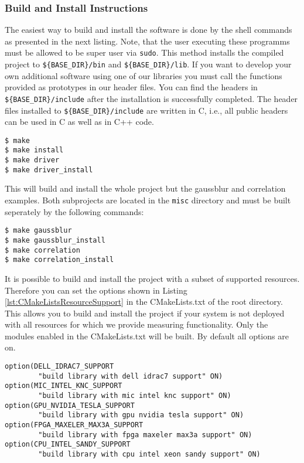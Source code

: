 \subsubsection{Build and Install Instructions}\label{sec:BuildInstallInstructions}
The easiest way to build and install the software is done by the shell commands as presented in the next listing. Note, that the user executing these programms must be allowed to be super user via \texttt{sudo}. This method installs the compiled project to \texttt{\$\{BASE\_DIR\}/bin} and \texttt{\$\{BASE\_DIR\}/lib}. If you want to develop your own additional software using one of our libraries you must call the functions provided as prototypes in our header files. You can find the headers in \texttt{\$\{BASE\_DIR\}/include} after the installation is successfully completed. The header files installed to \texttt{\$\{BASE\_DIR\}/include} are written in C, i.e., all public headers can be used in C as well as in C++ code.

\begin{lstlisting}[caption={Default build instructions.}, label=lst:Make]
$ make
$ make install
$ make driver
$ make driver_install
\end{lstlisting}

This will build and install the whole project but the gaussblur and correlation examples. Both subprojects are located in the \texttt{misc} directory and must be built seperately by the following commands:

\pagebreak

\begin{lstlisting}[caption={Default build instructions for additional applications. Note, that you need the PGI OpenACC compiler as well as Nvidia's \texttt{nvcc}.}, label=lst:MakeApps]
$ make gaussblur
$ make gaussblur_install
$ make correlation
$ make correlation_install
\end{lstlisting}

It is possible to build and install the project with a subset of supported resources. Therefore you can set the options shown in Listing \ref{lst:CMakeListsResourceSupport} in the CMakeLists.txt of the root directory. This allows you to build and install the project if your system is not deployed with all resources for which we provide measuring functionality. Only the modules enabled in the CMakeLists.txt will be built. By default all options are on.

\begin{lstlisting}[caption={CMakeLists.txt options.}, label=lst:CMakeListsResourceSupport]
option(DELL_IDRAC7_SUPPORT
		"build library with dell idrac7 support" ON)
option(MIC_INTEL_KNC_SUPPORT 
		"build library with mic intel knc support" ON)
option(GPU_NVIDIA_TESLA_SUPPORT 
		"build library with gpu nvidia tesla support" ON)
option(FPGA_MAXELER_MAX3A_SUPPORT 
		"build library with fpga maxeler max3a support" ON)
option(CPU_INTEL_SANDY_SUPPORT 
		"build library with cpu intel xeon sandy support" ON)
\end{lstlisting}

